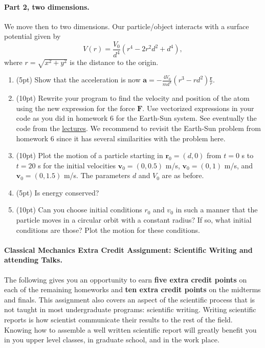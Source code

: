 \documentclass[%
oneside,                 %
final,                   %
10pt]{article}
\begin{document}
\noindent
\paragraph{Part 2, two dimensions.}
We move then to two dimensions. Our particle/object interacts with a surface potential given by
\[
V(r)=\frac{V_0}{d^4}\left(r^4-2r^2d^2+d^4\right),
\]
where $r=\sqrt{x^2+y^2}$ is the distance to the origin.

\begin{enumerate}
\item (5pt) Show that the acceleration is now $\bm{a}=-\frac{4V_0}{md^4}\left(r^3-rd^2\right)\frac{\bm{r}}{r}$.

\item (10pt) Rewrite your program to find the velocity and position of the atom using the new expression for the force $\bm{F}$. Use vectorized expressions in your code as you did in homework 6 for the Earth-Sun system. See eventually the code from the \href{{https://mhjensen.github.io/Physics321/doc/pub/energyconserv/html/energyconserv.html}}{lectures}.  We recommend to revisit the Earth-Sun problem from homework 6 since it has several similarities with the problem here.

\item (10pt) Plot the motion of a particle starting in $\bm{r}_0=(d,0)$ from $t=0$ s to $t=20$ s for the initial velocities $\bm{v}_0=(0,0.5)$ m/s, $\bm{v}_0=(0,1)$ m/s, and $\bm{v}_0=(0,1.5)$ m/s. The parameters $d$ and $V_0$ are as before.

\item (5pt) Is energy conserved? 

\item (10pt) Can you choose initial conditions $r_0$ and $v_0$ in such a manner that the particle moves in a circular orbit with a constant radius? If so, what initial conditions are those? Plot the motion for these conditions.
\end{enumerate}

\noindent
\paragraph{Classical Mechanics Extra Credit Assignment: Scientific Writing and attending Talks.}
The following gives you an opportunity to earn \textbf{five extra credit
points} on each of the remaining homeworks and \textbf{ten extra credit points}
on the midterms and finals.  This assignment also covers an aspect of
the scientific process that is not taught in most undergraduate
programs: scientific writing.  Writing scientific reports is how
scientist communicate their results to the rest of the field.  Knowing
how to assemble a well written scientific report will greatly benefit
you in you upper level classes, in graduate school, and in the work
place.
\end{document}

